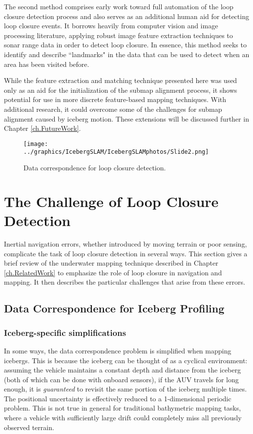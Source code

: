 The second method comprises early work toward full automation of the loop closure detection process and also serves as an additional human aid for detecting loop closure events. It borrows heavily from computer vision and image processing literature, applying robust image feature extraction techniques to sonar range data in order to detect loop closure. In essence, this method seeks to identify and describe ``landmarks" in the data that can be used to detect when an area has been visited before. 

 While the feature extraction and matching technique presented here was used only as an aid for the initialization of the submap alignment process, it shows potential for use in more discrete feature-based mapping techniques. With additional research, it could overcome some of the challenges for submap alignment caused by iceberg motion. These extensions will be discussed further in Chapter \ref{ch.FutureWork}.

\begin{figure}[htb]
   \centering
   \texttt{[image: ../graphics/IcebergSLAM/IcebergSLAMphotos/Slide2.png]} %
   \caption{Data correspondence for loop closure detection. }
   \label{fig:icebergSLAMLC}
\end{figure}

\section{The Challenge of Loop Closure Detection}

Inertial navigation errors, whether introduced by moving terrain or poor sensing, complicate the task of loop closure detection in several ways. This section gives a brief review of the underwater mapping technique described in Chapter \ref{ch.RelatedWork} to emphasize the role of loop closure in navigation and mapping. It then describes the particular challenges that arise from these errors.

\subsection{Data Correspondence for Iceberg Profiling}

\subsubsection{Iceberg-specific simplifications}

In some ways, the data correspondence problem is simplified when mapping icebergs. This is because the iceberg can be thought of as a cyclical environment: assuming the vehicle maintains a constant depth and distance from the iceberg (both of which can be done with onboard sensors), if the AUV travels for long enough, it is \emph{guaranteed} to revisit the same portion of the iceberg multiple times. The positional uncertainty is effectively reduced to a 1-dimensional periodic problem. This is not true in general for traditional bathymetric mapping tasks, where a vehicle with sufficiently large drift could completely miss all previously observed terrain. 

